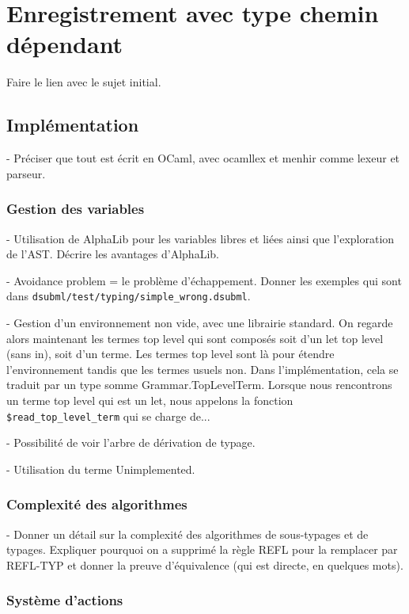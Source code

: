 \chapter{Enregistrement avec type chemin dépendant}

Faire le lien avec le sujet initial.

\section{Implémentation}

- Préciser que tout est écrit en OCaml, avec ocamllex et menhir comme lexeur et parseur.

\subsection{Gestion des variables}

- Utilisation de AlphaLib pour les variables libres et liées ainsi que
l'exploration de l'AST. Décrire les avantages d'AlphaLib.

- Avoidance problem = le problème d'échappement. Donner les exemples qui sont
dans \verb|dsubml/test/typing/simple_wrong.dsubml|.

- Gestion d'un environnement non vide, avec une librairie standard. On regarde
alors maintenant les termes top level qui sont composés soit d'un let top level
(sans in), soit d'un terme. Les termes top level sont là pour étendre
l'environnement tandis que les termes usuels non. Dans l'implémentation, cela se
traduit par un type somme Grammar.TopLevelTerm. Lorsque nous rencontrons un
terme top level qui est un let, nous appelons la fonction \verb|$read_top_level_term|
qui se charge de...

- Possibilité de voir l'arbre de dérivation de typage.

- Utilisation du terme Unimplemented.

\subsection{Complexité des algorithmes}

- Donner un détail sur la complexité des algorithmes de sous-typages et de
typages. Expliquer pourquoi on a supprimé la règle REFL pour la remplacer par
REFL-TYP et donner la preuve d'équivalence (qui est directe, en quelques mots).

\subsection{Système d'\og actions \fg}

